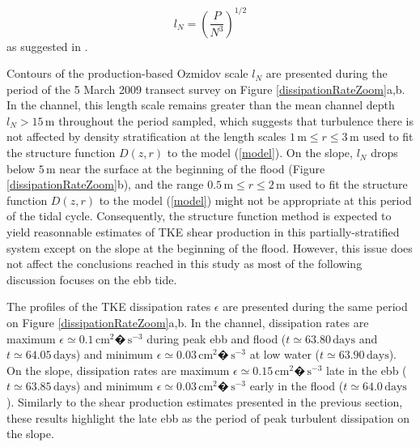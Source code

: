 \begin{equation}
l_N = \left(\frac{P}{N^3}\right)^{1/2}
\label{ozmidovScale}
\end{equation}
as suggested in \textcite{Stacey:1999p2609}.

Contours of the production-based Ozmidov scale $l_N$ are presented during the period of the 5 March 2009 transect survey on Figure \ref{dissipationRateZoom}a,b. In the channel, this length scale remains greater than the mean channel depth $l_N > 15 \, \mathrm{m}$ throughout the period sampled, which suggests that turbulence there is not affected by density stratification at the length scales $1 \, \mathrm{m} \leq r \leq 3 \, \mathrm{m}$ used to fit the structure function $D(z,r)$ to the model (\ref{model}). On the slope, $l_N$ drops below $5 \, \mathrm{m}$ near the surface at the beginning of the flood (Figure \ref{dissipationRateZoom}b), and the range $0.5 \, \mathrm{m} \leq r \leq 2 \, \mathrm{m}$ used to fit the structure function $D(z,r)$ to the model (\ref{model}) might not be appropriate at this period of the tidal cycle. Consequently, the structure function method is expected to yield reasonnable estimates of TKE shear production in this partially-stratified system except on the slope at the beginning of the flood. However, this issue does not affect the conclusions reached in this study as most of the following discussion focuses on the ebb tide.

The profiles of the TKE dissipation rates $\epsilon$ are presented during the same period on Figure \ref{dissipationRateZoom}a,b. In the channel, dissipation rates are maximum $\epsilon \simeq 0.1 \, \mathrm{cm^2�\, s^{-3}}$ during peak ebb and flood ($t \simeq 63.80 \, \mathrm{days}$ and $t \simeq 64.05 \, \mathrm{days}$) and minimum $\epsilon \simeq 0.03 \, \mathrm{cm^2�\, s^{-3}}$ at low water ($t \simeq 63.90 \, \mathrm{days}$). On the slope, dissipation rates are maximum $\epsilon \simeq 0.15 \, \mathrm{cm^2�\, s^{-3}}$ late in the ebb ($t \simeq 63.85 \, \mathrm{days}$) and minimum $\epsilon \simeq 0.03 \, \mathrm{cm^2�\, s^{-3}}$ early in the flood ($t \simeq 64.0 \, \mathrm{days}$). Similarly to the shear production estimates presented in the previous section, these results highlight the late ebb as the period of peak turbulent dissipation on the slope.

